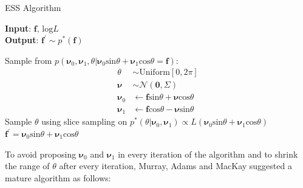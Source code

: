 \documentclass{article}
\begin{document}
\begin{algorithm}
\caption{ESS Algorithm}\label{ess}
\hspace*{\algorithmicindent} \textbf{Input}: $\mathbf{f},\,\text{log}L$ \\
\hspace*{\algorithmicindent} \textbf{Output}: $\mathbf{f^'}\sim p^*(\mathbf{f})$ 
\begin{algorithmic}[1]
  \State Sample from $p(\pmb{\nu}_0,\pmb{\nu}_1,\theta|\pmb{\nu}_0\text{sin}\theta+\pmb{\nu}_1\text{cos}\theta=\mathbf{f})$:
\begin{align*}
\theta &\sim\text{Uniform}[0,2\pi]\\
\pmb{\nu}&\sim\mathcal{N}(\mathbf{0},\Sigma)\\ 
\pmb{\nu}_0 &\leftarrow\mathbf{f}\text{sin}\theta+\pmb{\nu}\text{cos}\theta\\
\pmb{\nu}_1 &\leftarrow\mathbf{f}\text{cos}\theta-\pmb{\nu}\text{sin}\theta
\end{align*}
  \State Sample $\theta$ using slice sampling on $p^*(\theta|\pmb{\nu}_0,\pmb{\nu}_1)\propto L(\pmb{\nu}_0\text{sin}\theta+\pmb{\nu}_1\text{cos}\theta)$ 
  \State $\mathbf{f^{'}}=\pmb{\nu}_0\text{sin}\theta+\pmb{\nu}_1\text{cos}\theta$
\end{algorithmic}
\end{algorithm}

To avoid proposing $\pmb{\nu}_{0}$ and $\pmb{\nu}_{1}$ in every iteration of the algorithm and to shrink the range of $\theta$ after every iteration, Murray, Adams and MacKay \cite{MAM} 
suggested a mature algorithm as follows:
\end{document}

